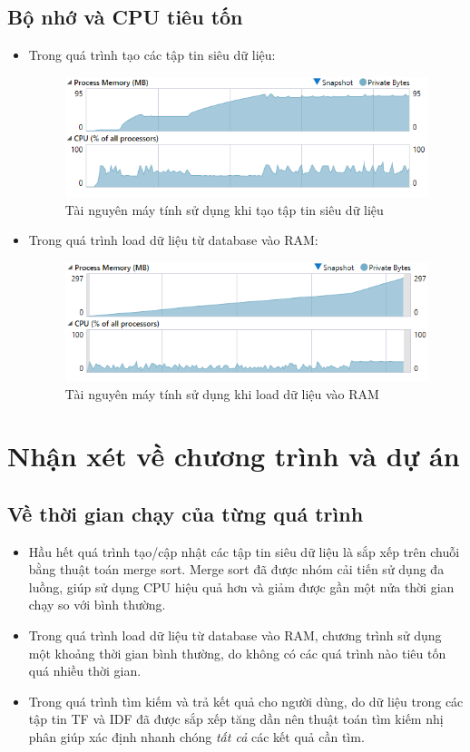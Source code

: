 \documentclass[12pt,a4paper]{article}
\begin{document}
\subsection{Bộ nhớ và CPU tiêu tốn}
\begin{itemize}
\item Trong quá trình tạo các tập tin siêu dữ liệu:
\begin{figure}[H]
\begin{center}
\includegraphics[scale=0.75]{Fig33}
\end{center}
\caption{Tài nguyên máy tính sử dụng khi tạo tập tin siêu dữ liệu}
\label{Fig33}
\end{figure}
\item Trong quá trình load dữ liệu từ database vào RAM:
\begin{figure}[H]
\begin{center}
\includegraphics[scale=0.75]{Fig34}
\end{center}
\caption{Tài nguyên máy tính sử dụng khi load dữ liệu vào RAM}
\label{Fig34}
\end{figure}
\end{itemize}
\newpage
\section{Nhận xét về chương trình và dự án}
\subsection{Về thời gian chạy của từng quá trình}
\begin{itemize}
\item Hầu hết quá trình tạo/cập nhật các tập tin siêu dữ liệu là sắp xếp trên chuỗi bằng thuật toán merge sort. Merge sort đã được nhóm cải tiến sử dụng đa luồng, giúp sử dụng CPU hiệu quả hơn và giảm được gần một nửa thời gian chạy so với bình thường.
\item Trong quá trình load dữ liệu từ database vào RAM, chương trình sử dụng một khoảng thời gian bình thường, do không có các quá trình nào tiêu tốn quá nhiều thời gian.
\item Trong quá trình tìm kiếm và trả kết quả cho người dùng, do dữ liệu trong các tập tin TF và IDF đã được sắp xếp tăng dần nên thuật toán tìm kiếm nhị phân giúp xác định nhanh chóng \textit{tất cả} các kết quả cần tìm.
\end{itemize}
\end{document}

